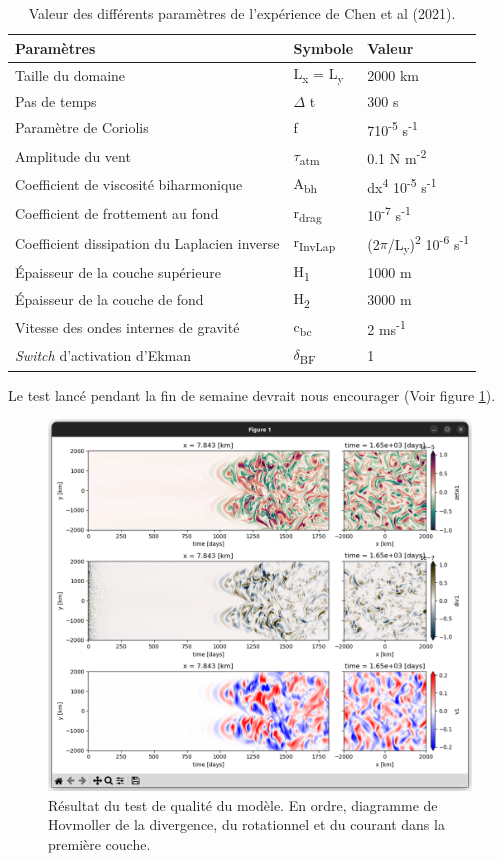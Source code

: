 \documentclass{article}
\numberwithin{equation}{section}
\begin{document}
\begin{table}[htbp]
\caption{Valeur des différents paramètres de l'expérience de Chen et al (2021).}
\centering
\begin{tabular}{lll}
\hline
\hline
Paramètres & Symbole & Valeur\\[0pt]
\hline
Taille du domaine & L\textsubscript{x} = L\textsubscript{y} & 2000 km\\[0pt]
Pas de temps & \(\Delta\) t & 300 s\\[0pt]
Paramètre de Coriolis & f & 7\texttimes{}10\textsuperscript{-5} s\textsuperscript{-1}\\[0pt]
Amplitude du vent & \(\tau\)\textsubscript{atm} & 0.1 N m\textsuperscript{-2}\\[0pt]
Coefficient de viscosité biharmonique & A\textsubscript{bh} & dx\textsuperscript{4} \texttimes{}10\textsuperscript{-5} s\textsuperscript{-1}\\[0pt]
Coefficient de frottement au fond & r\textsubscript{drag} & 10\textsuperscript{-7} s\textsuperscript{-1}\\[0pt]
Coefficient dissipation du Laplacien inverse & r\textsubscript{InvLap} & (2\(\pi\)/L\textsubscript{y})\textsuperscript{2} \texttimes{} 10\textsuperscript{-6} s\textsuperscript{-1}\\[0pt]
Épaisseur de la couche supérieure & H\textsubscript{1} & 1000 m\\[0pt]
Épaisseur de la couche de fond & H\textsubscript{2} & 3000 m\\[0pt]
Vitesse des ondes internes de gravité & c\textsubscript{bc} & 2 ms\textsuperscript{-1}\\[0pt]
\emph{Switch} d'activation d'Ekman & \(\delta\)\textsubscript{BF} & 1\\[0pt]
\hline
\end{tabular}
\end{table}

Le test lancé pendant la fin de semaine devrait nous encourager (Voir figure \ref{fig:org7b3caee}).

\begin{figure}[htbp]
\centering
\includegraphics[width=.9\linewidth]{figures/tests/test_SW_2023-03-18.png}
\caption{\label{fig:org7b3caee}Résultat du test de qualité du modèle. En ordre, diagramme de Hovmoller de la divergence, du rotationnel et du courant dans la première couche.}
\end{figure}
\end{document}

